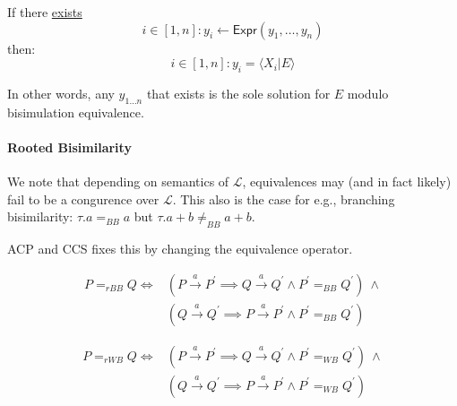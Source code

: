 \documentclass[99-notes-packed.tex]{subfiles}
\begin{document}
\begin{definition}
    If there \underline{exists}
    \begin{equation*}
        i \in [1, n]: y_i \leftarrow \mathsf{Expr}(y_1, \dots, y_n)
    \end{equation*}
    then: 
    \begin{equation*}
        i \in [1, n]: y_i = \langle X_i | E \rangle
    \end{equation*}

    In other words, any $y_{1 \dots n}$ that exists is the sole solution for $E$ modulo bisimulation equivalence. 
\end{definition}

\paragraph*{Rooted Bisimilarity}
We note that depending on semantics of $\mathcal{L}$, equivalences may (and in fact likely) fail to be a congurence over $\mathcal{L}$. This also is the case for e.g., branching bisimilarity: $\tau.a =_{BB} a$ but $\tau.a + b \ne_{BB} a + b$. 

ACP and CCS fixes this by changing the equivalence operator. 

\begin{definition}
    \begin{align*}
        P =_{rBB} Q \iff &(P \xrightarrow{a} P^{'} \implies Q \xrightarrow{a} Q^{'} \wedge P^{'} =_{BB} Q^{'})\ \wedge \\
        &(Q \xrightarrow{a} Q^{'} \implies P \xrightarrow{a} P^{'} \wedge P^{'} =_{BB} Q^{'})
    \end{align*}
\end{definition}

\begin{definition}
    \begin{align*}
        P =_{rWB} Q \iff &(P \xrightarrow{a} P^{'} \implies Q \xrightarrow{a} Q^{'} \wedge P^{'} =_{WB} Q^{'})\ \wedge \\
        &(Q \xrightarrow{a} Q^{'} \implies P \xrightarrow{a} P^{'} \wedge P^{'} =_{WB} Q^{'})
    \end{align*}
\end{definition}
\end{document}
